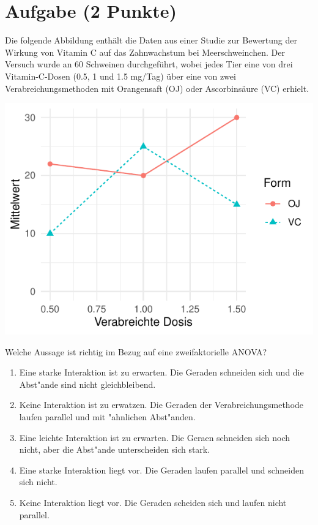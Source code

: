\documentclass[a4paper, 10pt]{scrartcl}\usepackage[]{graphicx}\usepackage[]{xcolor}
\makeatletter
\def\maxwidth{ %
  \ifdim\Gin@nat@width>\linewidth
    \linewidth
  \else
    \Gin@nat@width
  \fi
}
\makeatother
\begin{document}
\section{Aufgabe \hfill (2 Punkte)}

Die folgende Abbildung enth{\"a}lt die Daten aus einer Studie zur
Bewertung der Wirkung von Vitamin C auf das Zahnwachstum bei
Meerschweinchen. Der Versuch wurde an 60 Schweinen durchgef{\"u}hrt, wobei
jedes Tier eine von drei Vitamin-C-Dosen (0.5, 1 und 1.5 mg/Tag) {\"u}ber eine
von zwei Verabreichungsmethoden mit Orangensaft (OJ)  oder
Ascorbins{\"a}ure (VC) erhielt. 



{\centering \includegraphics[width=\maxwidth]{img/mc-anova-02-a-1} 

}




Welche Aussage ist richtig im Bezug auf eine zweifaktorielle ANOVA?



\begin{enumerate}
\item [\textbf{A} \msquare] Eine starke Interaktion ist zu erwarten. Die Geraden schneiden sich und die Abst{"a}nde sind nicht gleichbleibend.
\item [\textbf{B} \msquare] Keine Interaktion ist zu erwatzen. Die Geraden der Verabreichungsmethode laufen parallel und mit {"a}hnlichen Abst{"a}nden.
\item [\textbf{C} \msquare] Eine leichte Interaktion ist zu erwarten. Die Geraen schneiden sich noch nicht, aber die Abst{"a}nde unterscheiden sich stark.
\item [\textbf{D} \msquare] Eine starke Interaktion liegt vor. Die Geraden laufen parallel und schneiden sich nicht.
\item [\textbf{E} \msquare] Keine Interaktion liegt vor. Die Geraden scheiden sich und laufen nicht parallel.
\end{enumerate} 
\end{document}
